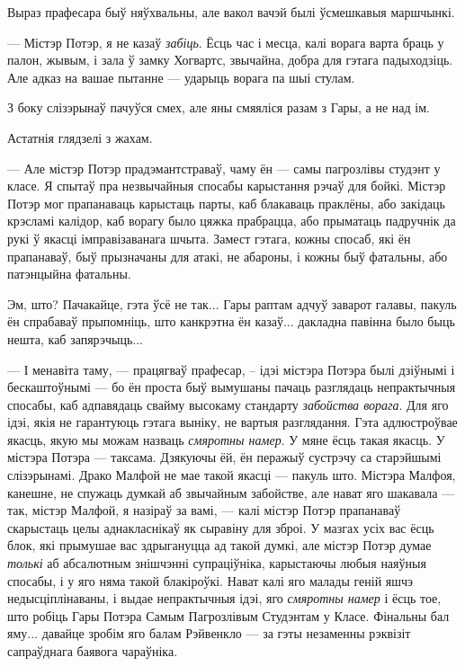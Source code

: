 Выраз прафесара быў няўхвальны, але вакол вачэй былі ўсмешкавыя маршчынкі.

--- Містэр Потэр, я не казаў \emph{забіць}. Ёсць час і месца, калі ворага варта браць 
у палон, жывым, і зала ў замку Хогвартс, звычайна, добра для гэтага падыходзіць.
Але адказ на вашае пытанне --- ударыць ворага па шыі стулам.

З боку слізэрынаў пачуўся смех, але яны смяяліся разам з Гары, а не над ім.

Астатнія глядзелі з жахам.

--- Але містэр Потэр прадэмантстраваў, чаму ён --- самы пагрозлівы студэнт у класе. 
Я спытаў пра незвычайныя спосабы карыстання рэчаў для бойкі. Містэр Потэр мог 
прапанаваць карыстаць парты, каб блакаваць праклёны, або закідаць крэсламі калідор,
каб ворагу было цяжка прабрацца, або прыматаць падручнік да рукі ў якасці 
імправізаванага шчыта. Замест гэтага, кожны спосаб, які ён прапанаваў,
быў прызначаны для атакі, не абароны, і кожны быў фатальны, або патэнцыйна фатальны.

Эм, што? Пачакайце, гэта ўсё не так... Гары раптам адчуў заварот галавы, пакуль ён
спрабаваў прыпомніць, што канкрэтна ён казаў... дакладна павінна было быць нешта,
каб запярэчыць...

--- І менавіта таму, --- працягваў прафесар, -- ідэі містэра Потэра былі дзіўнымі 
і бескаштоўнымі --- бо ён проста быў вымушаны пачаць разглядаць непрактычныя спосабы, каб
адпавядаць свайму высокаму стандарту \emph{забойства ворага}. Для яго ідэі, якія 
не гарантуюць гэтага выніку, не вартыя разглядання. Гэта адлюстроўвае якасць,
якую мы можам назваць \emph{смяротны намер}. У мяне ёсць такая якасць. У містэра Потэра ---
таксама. Дзякуючы ёй, ён перажыў сустрэчу са старэйшымі слізэрынамі. 
Драко Малфой не мае такой якасці --- пакуль што. Містэра Малфоя, канешне,
не спужаць думкай аб звычайным забойстве, але нават яго шакавала --- так, містэр 
Малфой, я назіраў за вамі, --- калі містэр Потэр прапанаваў скарыстаць целы 
аднакласнікаў як сыравіну для зброі. У мазгах усіх вас ёсць блок, які 
прымушае вас здрыгануцца ад такой думкі, але містэр Потэр думае \emph{толькі}
аб абсалютным знішчэнні супраціўніка, карыстаючы любыя наяўныя спосабы, і у яго 
няма такой блакіроўкі. 
Нават калі яго малады геній яшчэ недысціплінаваны, і выдае непрактычныя ідэі,
яго \emph{смяротны намер} і ёсць тое, што робіць Гары Потэра Самым Пагрозлівым 
Студэнтам у Класе. Фінальны бал яму... давайце зробім яго балам Рэйвенкло ---
за гэты незаменны рэквізіт сапраўднага баявога чараўніка.

